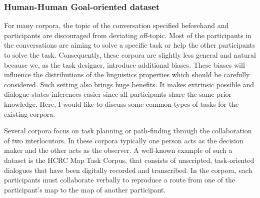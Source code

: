 \documentclass[bsc,frontabs,twoside,singlespacing,parskip,deptreport]{infthesis}     %
\begin{document}

\subsubsection{Human-Human Goal-oriented dataset}

For many corpora, the topic of the conversation specified beforehand and participants are discouraged from deviating off-topic. Most of the participants in the conversations are aiming to solve a specific task or help the other participants to solve the task. Consequently, these corpora are slightly less general and natural because we, as the task designer, introduce additional biases. These biases will influence the distributions of the linguistics properties which should be carefully considered. Such setting also brings huge benefits. It makes extrinsic possible and dialogue states inferenecs easier since all participants share the same prior knowledge. Here, I would like to discuss some common types of tasks for the existing corpora.

Several corpora focus on task planning or path-finding through the collaboration of two interlocutors. In these corpora typically one person acts as the decision maker and the other acts as the observer. A well-known example of such a dataset is the HCRC Map Task Corpus\cite{anderson1991hcrc}, that consists of unscripted, task-oriented dialogues that have been digitally recorded and transcribed. In the corpora, each participants must collaborate verbally to reproduce a route from one of the participant’s map to the map of another participant. 
\end{document}

